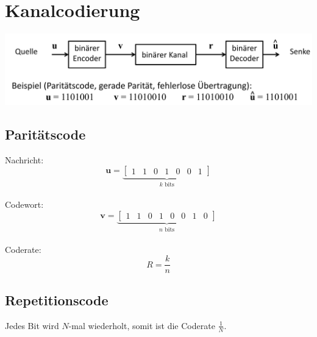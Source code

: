 \chapter{Kanalcodierung}
\begin{center}
	\includegraphics[width=.9\textwidth]{./images/bincode.png}
\end{center}
\section{Paritätscode}
Nachricht:
\[ \textbf{u} = \underbrace{
	\begin{bmatrix}1 & 1 & 0 & 1 & 0 & 0 & 1\end{bmatrix}
	}_\textrm{$k$ bits} \]
~\\
Codewort:
\[ \textbf{v} = \underbrace{
	\begin{bmatrix}1 & 1 & 0 & 1 & 0 & 0 & 1 & 0\end{bmatrix}
	}_\textrm{$n$ bits} \]
~\\
Coderate:
\[ R = \frac{k}{n} \]
\section{Repetitionscode}
Jedes Bit wird $N$-mal wiederholt, somit ist die Coderate $\frac{1}{N}$.

